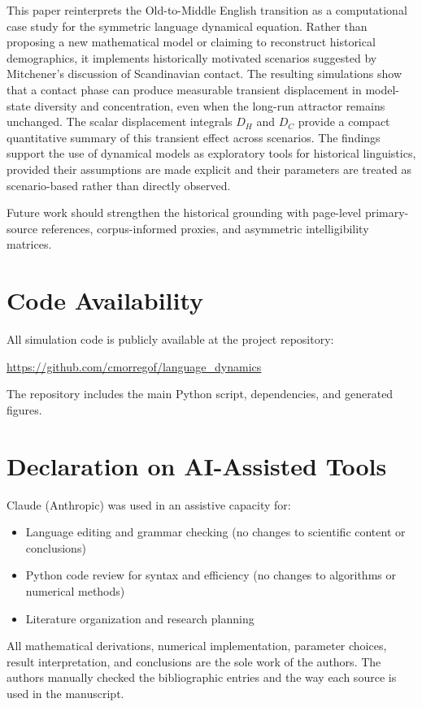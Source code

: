 \documentclass[11pt]{article}
\begin{document}
This paper reinterprets the Old-to-Middle English transition as a computational case study for the symmetric language dynamical equation. Rather than proposing a new mathematical model or claiming to reconstruct historical demographics, it implements historically motivated scenarios suggested by Mitchener's discussion of Scandinavian contact. The resulting simulations show that a contact phase can produce measurable transient displacement in model-state diversity and concentration, even when the long-run attractor remains unchanged. The scalar displacement integrals $D_H$ and $D_C$ provide a compact quantitative summary of this transient effect across scenarios. The findings support the use of dynamical models as exploratory tools for historical linguistics, provided their assumptions are made explicit and their parameters are treated as scenario-based rather than directly observed.

Future work should strengthen the historical grounding with page-level primary-source references, corpus-informed proxies, and asymmetric intelligibility matrices.

\section*{Code Availability}

All simulation code is publicly available at the project repository:
\begin{center}
\url{https://github.com/cmorregof/language_dynamics}
\end{center}
The repository includes the main Python script, dependencies, and generated figures.

\section*{Declaration on AI-Assisted Tools}
Claude (Anthropic) was used in an assistive capacity for:
\begin{itemize}
    \item Language editing and grammar checking (no changes to scientific content or conclusions)
    \item Python code review for syntax and efficiency (no changes to algorithms or numerical methods)
    \item Literature organization and research planning
\end{itemize}
All mathematical derivations, numerical implementation, parameter choices, result interpretation, and conclusions are the sole work of the authors. The authors manually checked the bibliographic entries and the way each source is used in the manuscript.
\end{document}
